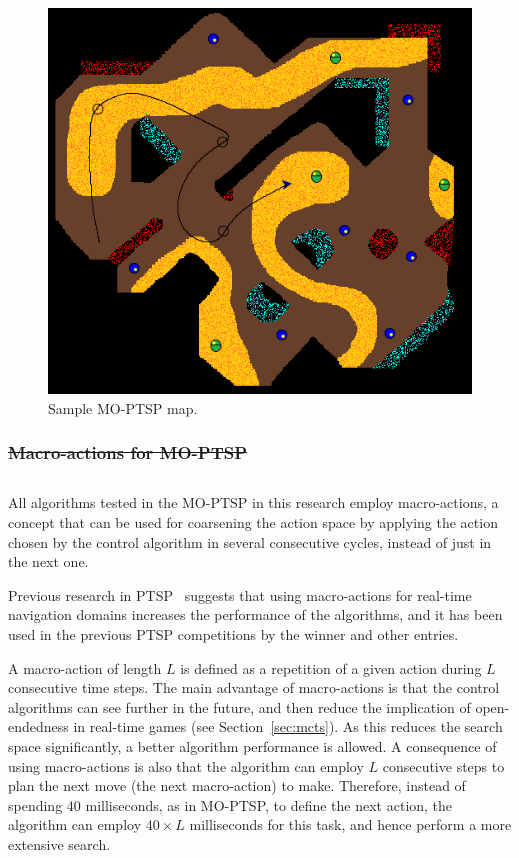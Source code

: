 \documentclass[journal]{IEEEtran}
\providecommand{\DIFaddtex}[1]{{\protect\color{blue}\uwave{#1}}} %
\providecommand{\DIFdeltex}[1]{{\protect\color{red}\sout{#1}}}                      %
\providecommand{\DIFaddbegin}{} %
\providecommand{\DIFaddend}{} %
\providecommand{\DIFdelbegin}{} %
\providecommand{\DIFdelend}{} %
\providecommand{\DIFadd}[1]{\texorpdfstring{\DIFaddtex{#1}}{#1}} %
\providecommand{\DIFdel}[1]{\texorpdfstring{\DIFdeltex{#1}}{}} %
\begin{document}
\begin{figure} [!t]
	\begin{center}
	\includegraphics[width=0.8\columnwidth]{img/moptspmap}
	\caption{Sample MO-PTSP map.}
	\label{fig:sampleMap}
	\end{center}
\end{figure}

\DIFdelbegin \subsubsection{\DIFdel{Macro-actions for MO-PTSP}} %
\addtocounter{subsubsection}{-1}%
\DIFdelend \DIFaddbegin \subsection{\DIFadd{Heuristics for MO-PTSP}} \label{sssec:heurMOPTSP}
\DIFaddend 

All \DIFaddbegin \DIFadd{the }\DIFaddend algorithms tested in the MO-PTSP in this research employ macro-actions, a concept that can be used for coarsening the action space by applying the action chosen by the control algorithm in several consecutive cycles, instead of just in the next one. 

Previous research in PTSP~\cite{Perez2013, Perez2012} suggests that using macro-actions for real-time navigation domains increases the performance of the algorithms, and it has been used in the previous PTSP competitions by the winner and other entries.

A macro-action of length $L$ is defined as a repetition of a given action during $L$ consecutive time steps. The main advantage of macro-actions is that the control algorithms can see further in the future, and then reduce the implication of open-endedness in real-time games (see Section~\ref{sec:mcts}). As this reduces the search space significantly, a better algorithm performance is allowed. A consequence of using macro-actions is also that the algorithm can employ $L$ consecutive steps to plan the next move (the next macro-action) to make. Therefore, instead of spending $40$ milliseconds, as in MO-PTSP, to define the next action, the algorithm can employ $40 \times L$ milliseconds for this task, and hence perform a more extensive search. 
\end{document}
